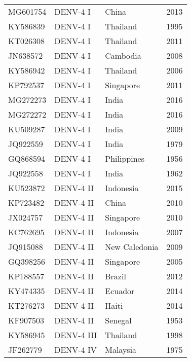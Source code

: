 \begin{scriptsize}
\begin{center}
\begin{longtable}{@{}lllc@{}}
\bottomrule
\endlastfoot
MG601754 & DENV-4 I            & China         & 2013            \\
KY586839 & DENV-4 I            & Thailand      & 1995            \\
KT026308 & DENV-4 I            & Thailand      & 2011            \\
JN638572 & DENV-4 I            & Cambodia      & 2008            \\
KY586942 & DENV-4 I            & Thailand      & 2006            \\
KP792537 & DENV-4 I            & Singapore     & 2011            \\
MG272273 & DENV-4 I            & India         & 2016            \\
MG272272 & DENV-4 I            & India         & 2016            \\
KU509287 & DENV-4 I            & India         & 2009            \\
JQ922559 & DENV-4 I            & India         & 1979            \\
GQ868594 & DENV-4 I            & Philippines   & 1956            \\
JQ922558 & DENV-4 I            & India         & 1962            \\
KU523872 & DENV-4 II           & Indonesia     & 2015            \\
KP723482 & DENV-4 II           & China         & 2010            \\
JX024757 & DENV-4 II           & Singapore     & 2010            \\
KC762695 & DENV-4 II           & Indonesia     & 2007            \\
JQ915088 & DENV-4 II           & New Caledonia & 2009            \\
GQ398256 & DENV-4 II           & Singapore     & 2005            \\
KP188557 & DENV-4 II           & Brazil        & 2012            \\
KY474335 & DENV-4 II           & Ecuador       & 2014            \\
KT276273 & DENV-4 II           & Haiti         & 2014            \\
KF907503 & DENV-4 II           & Senegal       & 1953            \\
KY586945 & DENV-4 III          & Thailand      & 1998            \\
JF262779 & DENV-4 IV           & Malaysia      & 1975           
\end{longtable}

\end{center}
\end{scriptsize}
